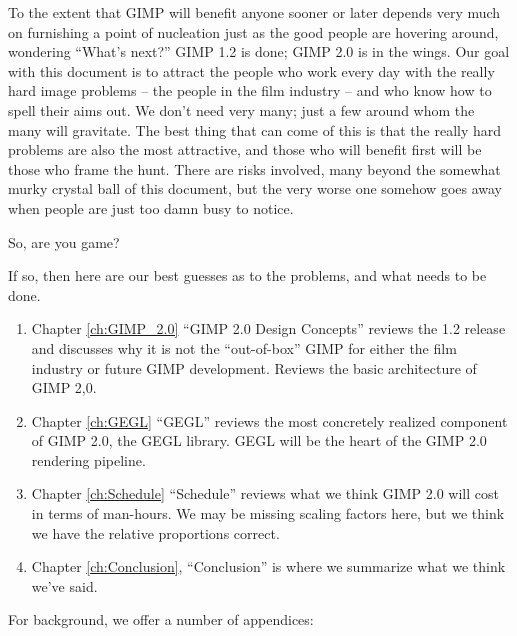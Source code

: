 To the extent that GIMP will benefit anyone sooner or later depends
very much on furnishing a point of nucleation just as the good people
are hovering around, wondering ``What's next?'' GIMP 1.2 is done; GIMP
2.0 is in the wings. Our goal with this document is to attract the
people who work every day with the really hard image problems -- the
people in the film industry -- and who know how to spell their aims
out. We don't need very many; just a few around whom the many will
gravitate. The best thing that can come of this is that the really
hard problems are also the most attractive, and those who will benefit
first will be those who frame the hunt. There are risks involved, many
beyond the somewhat murky crystal ball of this document, but the very
worse one somehow goes away when people are just too damn busy to
notice.

So, are you game?  

If so, then here are our best guesses as to the problems,
and what needs to be done.

\begin{enumerate}

\item Chapter \ref{ch:GIMP_2.0} ``GIMP 2.0 Design Concepts'' reviews the 1.2 
release and discusses why it is not the ``out-of-box'' GIMP for either
the film industry or future GIMP development.  Reviews the basic architecture 
of GIMP 2,0.

\item Chapter \ref{ch:GEGL} ``GEGL'' reviews the most concretely realized 
component of GIMP 2.0, the GEGL library. GEGL will be the heart of
the GIMP 2.0 rendering pipeline.

\item Chapter \ref{ch:Schedule} ``Schedule'' reviews what we think GIMP 2.0
will cost in terms of man-hours. We may be missing scaling factors
here, but we think we have the relative proportions correct.

\item Chapter \ref{ch:Conclusion}, ``Conclusion'' is where we 
summarize what we think we've said.

\end{enumerate}

For background, we offer a number of appendices:


